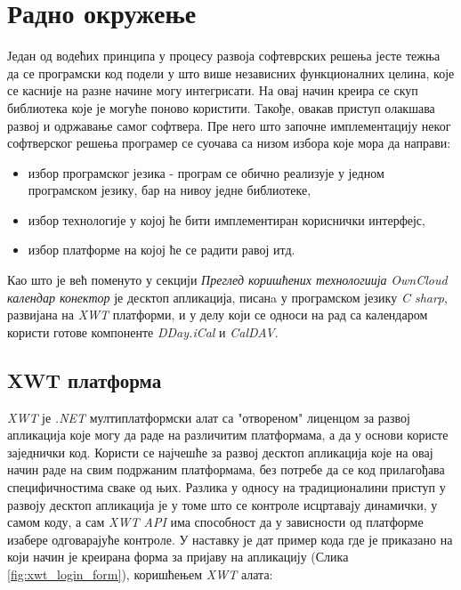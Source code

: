 \chapter{Радно окружење}
\label{chap:Radno okruzenje}

Један од водећих принципа у процесу развоја софтеврских решења јесте тежња да се програмски код подели у што више независних функционалних целина, које се касније на разне начине могу интегрисати. На овај начин креира се скуп библиотека које је могуће поново користити. Такође, овакав приступ олакшава развој и одржавање самог софтвера. Пре него што започне имплементацију неког софтверског решења програмер се суочава са низом избора које мора да направи:
\begin{itemize}
	\item {избор програмског језика - програм се обично реализује у једном програмском језику, бар на нивоу једне библиотеке},
	\item {избор технологије у којој ће бити имплементиран кориснички интерфејс},
	\item {избор платформе на којој ће се радити равој итд.} 
\end{itemize}

Као што је већ поменуто у секцији \textit{Преглед коришћених технологиија} \textit{OwnCloud календар конектор} је десктоп апликација, писанa у програмском језику \textit{C sharp}, развијана на \textit{XWT} платформи, и у делу који се односи на рад са календаром користи готове компоненте \textit{DDay.iCal} и \textit{CalDAV}.

\section {XWT платформа}

\textit{XWT} је \textit{.NET} мултиплатформски алат са "отвореном" лиценцом за развој апликација које могу да раде на различитим платформама, а да у основи користе заједнички код. Користи се најчешће за развој десктоп апликација које на овај начин раде на свим подржаним платформама, без потребе да се код прилагођава специфичностима сваке од њих. Разлика у односу на традиционалини приступ у развоју десктоп апликација је у томе што се контроле исцртавају динамички, у самом коду, а сам \textit{XWT API} има способност да у зависности од платформе изабере одговарајуће контроле. У наставку је дат пример кода где је приказано на који начин је креирана форма за пријаву на апликацију (Слика \ref{fig:xwt_login_form}), коришћењем \textit{XWT} алата:


